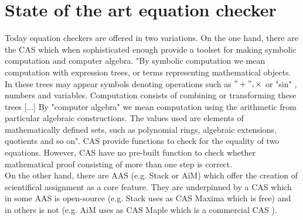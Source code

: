 

    \newcommand{\lstsetisabelle}{
    \lstset{
    language=Python,
    breaklines=true,
    commentstyle=\textit,
    basicstyle=\ttfamily,
    showstringspaces=false,
    frame=single,
    captionpos=b,
    morekeywords = [2]{local_dict, global_dict, evaluate},
    autogobble=true,
    numbers=left
    }
    }
    \chapter{State of the art equation checker}
    Today equation checkers are offered in two variations.
    On the one hand, there are the \ac{CAS} which when sophisticated enough provide a toolset for making symbolic computation and computer algebra. "By symbolic computation we
    mean computation with expression trees, or terms representing mathematical objects. In these trees may appear symbols denoting operations such as $"+", \times$ or "sin"
    , numbers and variables. Computation consists of combining or transforming these trees [...] By "computer algebra" we mean computation using the arithmetic from particular
    algebraic constructions. The values used are elements of mathematically defined sets, such as polynomial rings, algebraic extensions, quotients and so on"\cite[p.~1]{watt2006making}.
    \ac{CAS} provide functions to check for the equality of two equations. However, \ac{CAS} have no pre-built function to check whether mathematical proof consisting
    of more than one step is correct. \\
    On the other hand, there are \ac{AAS} (e.g. Stack or AiM)
    which offer the creation of scientifical assignment as a core feature. They are underpinned by a \ac{CAS} which in some \ac{AAS} is open-source (e.g. Stack uses
    as \ac{CAS} Maxima which is free) and in others is not (e.g. AiM uses as \ac{CAS} Maple which is a commercial \ac{CAS} )\cite[p.~1]{keady2012computer}.
